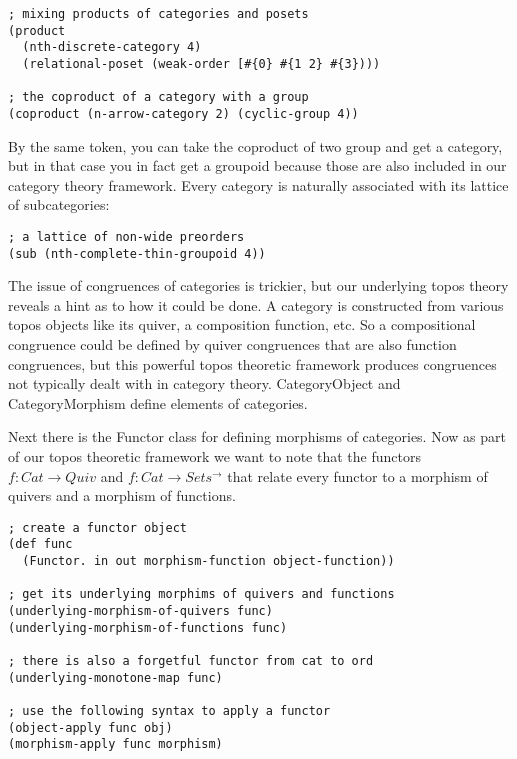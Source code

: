 \documentclass[a4paper,11pt]{report}
\begin{document}
\lstset {language=Lisp}
\begin{lstlisting}
; mixing products of categories and posets
(product 
  (nth-discrete-category 4) 
  (relational-poset (weak-order [#{0} #{1 2} #{3})))
  
; the coproduct of a category with a group
(coproduct (n-arrow-category 2) (cyclic-group 4))
\end{lstlisting}

By the same token, you can take the coproduct of two group and get a category, but in that case you in fact get a groupoid because those are also included in our category theory framework. Every category is naturally associated with its lattice of subcategories:

\lstset {language=Lisp}
\begin{lstlisting}
; a lattice of non-wide preorders 
(sub (nth-complete-thin-groupoid 4))
\end{lstlisting}

The issue of congruences of categories is trickier, but our underlying topos theory reveals a hint as to how it could be done. A category is constructed from various topos objects like its quiver, a composition function, etc. So a compositional congruence could be defined by quiver congruences that are also function congruences, but this powerful topos theoretic framework produces congruences not typically dealt with in category theory. CategoryObject and CategoryMorphism define elements of categories.

\newpage 

Next there is the Functor class for defining morphisms of categories. Now as part of our topos theoretic framework we want to note that the functors $f: Cat \to Quiv$ and $f: Cat \to Sets^{\to}$ that relate every functor to a morphism of quivers and a morphism of functions.

\lstset {language=Lisp}
\begin{lstlisting}
; create a functor object
(def func 
  (Functor. in out morphism-function object-function))

; get its underlying morphims of quivers and functions
(underlying-morphism-of-quivers func)
(underlying-morphism-of-functions func)

; there is also a forgetful functor from cat to ord
(underlying-monotone-map func)

; use the following syntax to apply a functor
(object-apply func obj)
(morphism-apply func morphism)
\end{lstlisting}
\end{document}
